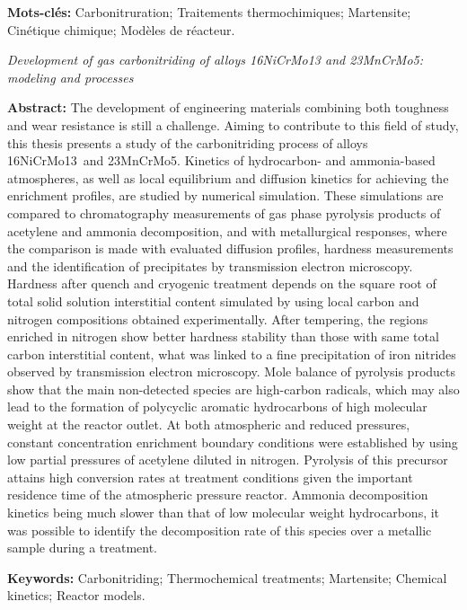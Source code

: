 \documentclass[10pt]{article}
\begin{document}
\par\vskip0.4cm\noindent\textbf{Mots-clés:} Carbonitruration; Traitements
thermochimiques; Martensite; Cinétique chimique; Modèles de réacteur.

\par\vskip0.4cm \noindent\emph{Development of gas carbonitriding of alloys
16NiCrMo13 and 23MnCrMo5: modeling and processes}\par\vskip0.4cm

\noindent\textbf{Abstract:} The development of engineering materials combining
both toughness and wear resistance is still a challenge. Aiming to contribute to
this field of study, this thesis presents a study of the carbonitriding process
of alloys 16NiCrMo13~and 23MnCrMo5. Kinetics of hydrocarbon- and ammonia-based
atmospheres, as well as local equilibrium and diffusion kinetics for achieving
the enrichment profiles, are studied by numerical simulation. These simulations
are compared to chromatography measurements of gas phase pyrolysis products of
acetylene and ammonia decomposition, and with metallurgical responses, where the
comparison is made with evaluated diffusion profiles, hardness measurements and
the identification of precipitates by transmission electron microscopy. Hardness
after quench and cryogenic treatment depends on the square root of total solid
solution interstitial content simulated by using local carbon and nitrogen
compositions obtained experimentally. After tempering, the regions enriched in
nitrogen show better hardness stability than those with same total carbon
interstitial content, what was linked to a fine precipitation of iron nitrides
observed by transmission electron microscopy. Mole balance of pyrolysis products
show that the main non-detected species are high-carbon radicals, which may also
lead to the formation of polycyclic aromatic hydrocarbons of high molecular
weight at the reactor outlet. At both atmospheric and reduced pressures,
constant concentration enrichment boundary conditions were established by using
low partial pressures of acetylene diluted in nitrogen. Pyrolysis of this
precursor attains high conversion rates at treatment conditions given the
important residence time of the atmospheric pressure reactor. Ammonia
decomposition kinetics being much slower than that of low molecular weight
hydrocarbons, it was possible to identify the decomposition rate of this species
over a metallic sample during  a treatment. 

\par\vskip0.4cm\noindent\textbf{Keywords:} Carbonitriding; Thermochemical
treatments; Martensite; Chemical kinetics; Reactor models.
\end{document}
